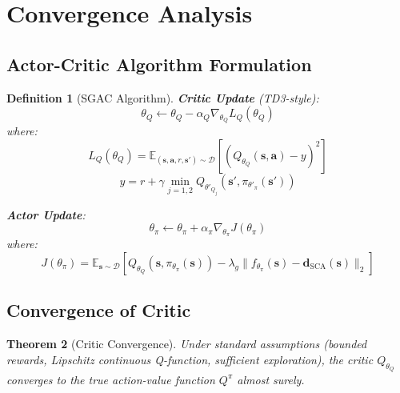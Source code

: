 \documentclass[11pt,a4paper]{article}
\newtheorem{theorem}{Theorem}[section]
\newtheorem{definition}[theorem]{Definition}
\newcommand{\E}{\mathbb{E}}
\newcommand{\calD}{\mathcal{D}}
\newcommand{\bs}{\mathbf{s}}
\newcommand{\ba}{\mathbf{a}}
\newcommand{\dsca}{\mathbf{d}_{\text{SCA}}}
\begin{document}
\section{Convergence Analysis}

\subsection{Actor-Critic Algorithm Formulation}

\begin{definition}[SGAC Algorithm]
\textbf{Critic Update} (TD3-style):
\begin{equation}
    \theta_Q \leftarrow \theta_Q - \alpha_Q \nabla_{\theta_Q} L_Q(\theta_Q)
\end{equation}
where:
\begin{equation}
    L_Q(\theta_Q) = \E_{(\bs, \ba, r, \bs') \sim \calD}\left[\left(Q_{\theta_Q}(\bs, \ba) - y\right)^2\right]
\end{equation}
\begin{equation}
    y = r + \gamma \min_{j=1,2} Q_{\theta'_{Q_j}}(\bs', \pi_{\theta'_\pi}(\bs'))
\end{equation}

\textbf{Actor Update}:
\begin{equation}
    \theta_\pi \leftarrow \theta_\pi + \alpha_\pi \nabla_{\theta_\pi} J(\theta_\pi)
\end{equation}
where:
\begin{equation}
    J(\theta_\pi) = \E_{\bs \sim \calD}\left[Q_{\theta_Q}(\bs, \pi_{\theta_\pi}(\bs)) - \lambda_g \|f_{\theta_\pi}(\bs) - \dsca(\bs)\|_2\right]
\end{equation}
\end{definition}

\subsection{Convergence of Critic}

\begin{theorem}[Critic Convergence]
\label{thm:critic}
Under standard assumptions (bounded rewards, Lipschitz continuous Q-function, sufficient exploration), the critic $Q_{\theta_Q}$ converges to the true action-value function $Q^\pi$ almost surely.
\end{theorem}
\end{document}
